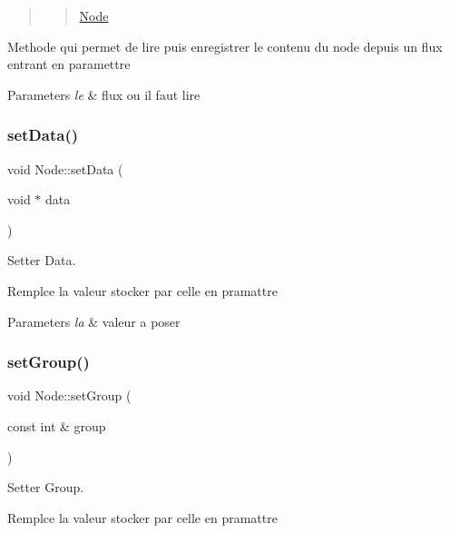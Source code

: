 \begin{quote}
\begin{quote}
\mbox{\hyperlink{class_node}{Node}}\end{quote}
\end{quote}


Methode qui permet de lire puis enregistrer le contenu du node depuis un flux entrant en paramettre


\begin{DoxyParams}{Parameters}
{\em le} & flux ou il faut lire \\
\hline
\end{DoxyParams}
\mbox{\label{class_node_a07d96eb3ce03cacd2b5a2af10365bc37}} 
\subsubsection{\texorpdfstring{set\+Data()}{setData()}}
{\footnotesize\ttfamily void Node\+::set\+Data (\begin{DoxyParamCaption}\item[{void $\ast$}]{data }\end{DoxyParamCaption})}



Setter Data. 

Remplce la valeur stocker par celle en pramattre


\begin{DoxyParams}{Parameters}
{\em la} & valeur a poser \\
\hline
\end{DoxyParams}
\mbox{\label{class_node_aa276d0e58d6b8e1a5c90634a1dcc10dd}} 
\subsubsection{\texorpdfstring{set\+Group()}{setGroup()}}
{\footnotesize\ttfamily void Node\+::set\+Group (\begin{DoxyParamCaption}\item[{const int \&}]{group }\end{DoxyParamCaption})}



Setter Group. 

Remplce la valeur stocker par celle en pramattre


